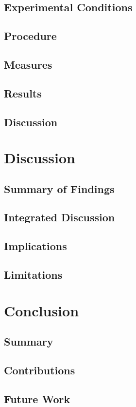\section{Experimental Conditions}

\section{Procedure}

\section{Measures}

\section{Results}

\section{Discussion}

\clearpage

\chapter{Discussion}

\section{Summary of Findings}

\section{Integrated Discussion}

\section{Implications}

\section{Limitations}

\clearpage

\chapter{Conclusion}

\section{Summary}

\section{Contributions}

\section{Future Work}
